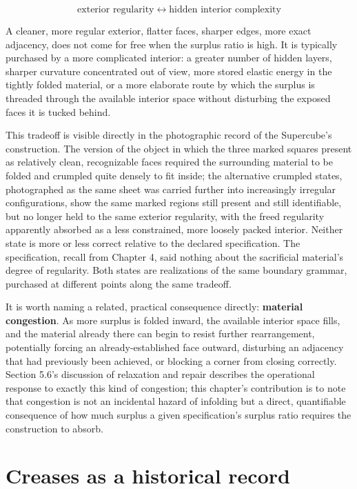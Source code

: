 \documentclass[11pt,oneside]{book}
\begin{document}
\[\text{exterior regularity} \;\leftrightarrow\; \text{hidden interior complexity}\]

A cleaner, more regular exterior, flatter faces, sharper edges, more
exact adjacency, does not come for free when the surplus ratio is high.
It is typically purchased by a more complicated interior: a greater
number of hidden layers, sharper curvature concentrated out of view,
more stored elastic energy in the tightly folded material, or a more
elaborate route by which the surplus is threaded through the available
interior space without disturbing the exposed faces it is tucked behind.

This tradeoff is visible directly in the photographic record of the
Supercube's construction. The version of the object in which the three
marked squares present as relatively clean, recognizable faces required
the surrounding material to be folded and crumpled quite densely to fit
inside; the alternative crumpled states, photographed as the same sheet
was carried further into increasingly irregular configurations, show the
same marked regions still present and still identifiable, but no longer
held to the same exterior regularity, with the freed regularity
apparently absorbed as a less constrained, more loosely packed interior.
Neither state is more or less correct relative to the declared
specification. The specification, recall from Chapter 4, said nothing
about the sacrificial material's degree of regularity. Both states are
realizations of the same boundary grammar, purchased at different points
along the same tradeoff.

It is worth naming a related, practical consequence directly:
\textbf{material congestion}. As more surplus is folded inward, the
available interior space fills, and the material already there can begin
to resist further rearrangement, potentially forcing an
already-established face outward, disturbing an adjacency that had
previously been achieved, or blocking a corner from closing correctly.
Section 5.6's discussion of relaxation and repair describes the
operational response to exactly this kind of congestion; this chapter's
contribution is to note that congestion is not an incidental hazard of
infolding but a direct, quantifiable consequence of how much surplus a
given specification's surplus ratio requires the construction to absorb.

\hypertarget{creases-as-a-historical-record}{%
\section{Creases as a historical
record}\label{creases-as-a-historical-record}}
\end{document}
